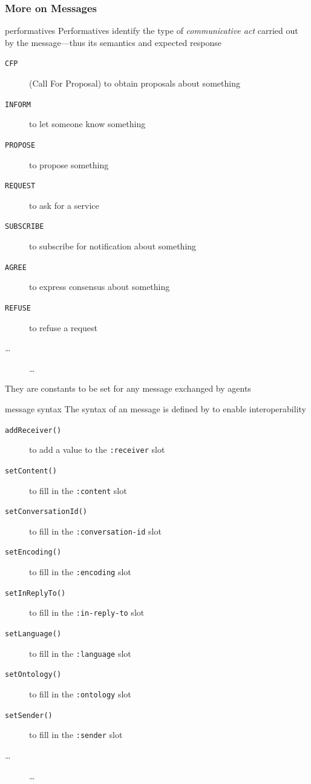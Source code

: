 \documentclass{beamer}\mode<presentation>{\usetheme{AMSCesenaPurpleAndGold}}
\begin{document}
\begin{frame}[c,allowframebreaks]\frametitle{More on \acl{} Messages}
    \begin{block}{\fipa{} performatives}
        \alert{Performatives} identify the type of \emph{communicative act} carried out by the message---thus its semantics and expected response
        \begin{description}
            \item[\texttt{CFP}] (Call For Proposal) to obtain proposals about something
            \item[\texttt{INFORM}] to let someone know something
            \item[\texttt{PROPOSE}] to propose something
            \item[\texttt{REQUEST}] to ask for a service
            \item[\texttt{SUBSCRIBE}] to subscribe for notification about something
            \item[\texttt{AGREE}] to express consensus about something
            \item[\texttt{REFUSE}] to refuse a request
            \item[\ldots] \ldots
        \end{description}
        They are constants to be set for any \acl{} message exchanged by agents
    \end{block}
    \begin{block}{\fipa{} message syntax}
        The syntax of an \acl{} message is defined by \fipa{} to enable interoperability
        \begin{description}
            \item[\texttt{addReceiver()}] to add a value to the \texttt{:receiver} slot
            \item[\texttt{setContent()}] to fill in the \texttt{:content} slot
            \item[\texttt{setConversationId()}] to fill in the \texttt{:conversation-id} slot
            \item[\texttt{setEncoding()}] to fill in the \texttt{:encoding} slot
            \item[\texttt{setInReplyTo()}] to fill in the \texttt{:in-reply-to} slot
            \item[\texttt{setLanguage()}] to fill in the \texttt{:language} slot
            \item[\texttt{setOntology()}] to fill in the \texttt{:ontology} slot
            \item[\texttt{setSender()}] to fill in the \texttt{:sender} slot
            \item[\ldots] \ldots
        \end{description}
    \end{block}
\end{frame}
\end{document}
